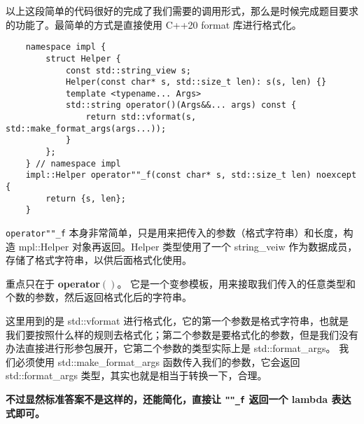 以上这段简单的代码很好的完成了我们需要的调用形式，那么是时候完成题目要求的功能了。最简单的方式是直接使用 C++20 format 库进行格式化。

\begin{verbatim}
    namespace impl {
        struct Helper {
            const std::string_view s;
            Helper(const char* s, std::size_t len): s(s, len) {}
            template <typename... Args>
            std::string operator()(Args&&... args) const {
                return std::vformat(s, std::make_format_args(args...));
            }
        };
    } // namespace impl
    impl::Helper operator""_f(const char* s, std::size_t len) noexcept {
        return {s, len};
    }
\end{verbatim}

\texttt{operator""_f} 本身非常简单，只是用来把传入的参数（格式字符串）和长度，构造 mpl::Helper 对象再返回。Helper 类型使用了一个 string\_veiw 作为数据成员，存储了格式字符串，以供后面格式化使用。

重点只在于 \textbf{operator$()$}。 它是一个变参模板，用来接取我们传入的任意类型和个数的参数，然后返回格式化后的字符串。

这里用到的是 std::vformat 进行格式化，它的第一个参数是格式字符串，也就是我们要按照什么样的规则去格式化；第二个参数是要格式化的参数，但是我们没有办法直接进行形参包展开，它第二个参数的类型实际上是 std::format\_args。 我们必须使用 std::make\_format\_args 函数传入我们的参数，它会返回 std::format\_args 类型，其实也就是相当于转换一下，合理。

\textbf{不过显然标准答案不是这样的，还能简化，直接让 \texttt{""_f} 返回一个 lambda 表达式即可。}

\clearpage